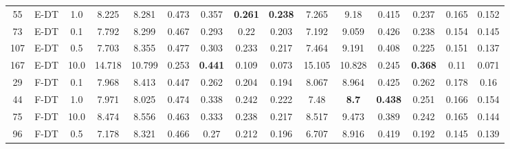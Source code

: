 \begin{table}
\begin{tabular}{@{\hskip3pt}c@{\hskip3pt}c@{\hskip3pt}c@{\hskip3pt}c@{\hskip3pt}c@{\hskip3pt}c@{\hskip3pt}c@{\hskip3pt}c@{\hskip3pt}c@{\hskip3pt}c@{\hskip3pt}c@{\hskip3pt}c@{\hskip3pt}c@{\hskip3pt}c@{\hskip3pt}c}
         55 &           E-DT &                      1.0 &             8.225 &           8.281 &           0.473 &           0.357 &  \textbf{0.261} &  \textbf{0.238} &               7.265 &          9.18 &           0.415 &           0.237 &           0.165 &          0.152 \\
         73 &           E-DT &                      0.1 &             7.792 &           8.299 &           0.467 &           0.293 &            0.22 &           0.203 &               7.192 &         9.059 &           0.426 &           0.238 &           0.154 &          0.145 \\
        107 &           E-DT &                      0.5 &             7.703 &           8.355 &           0.477 &           0.303 &           0.233 &           0.217 &               7.464 &         9.191 &           0.408 &           0.225 &           0.151 &          0.137 \\
        167 &           E-DT &                     10.0 &            14.718 &          10.799 &           0.253 &  \textbf{0.441} &           0.109 &           0.073 &              15.105 &        10.828 &           0.245 &  \textbf{0.368} &            0.11 &          0.071 \\
         29 &           F-DT &                      0.1 &             7.968 &           8.413 &           0.447 &           0.262 &           0.204 &           0.194 &               8.067 &         8.964 &           0.425 &           0.262 &           0.178 &           0.16 \\
         44 &           F-DT &                      1.0 &             7.971 &           8.025 &           0.474 &           0.338 &           0.242 &           0.222 &                7.48 &  \textbf{8.7} &  \textbf{0.438} &           0.251 &           0.166 &          0.154 \\
         75 &           F-DT &                     10.0 &             8.474 &           8.556 &           0.463 &           0.333 &           0.238 &           0.217 &               8.517 &         9.473 &           0.389 &           0.242 &           0.165 &          0.144 \\
         96 &           F-DT &                      0.5 &             7.178 &           8.321 &           0.466 &            0.27 &           0.212 &           0.196 &               6.707 &         8.916 &           0.419 &           0.192 &           0.145 &          0.139 \\
\bottomrule
\end{tabular}
\end{table}
